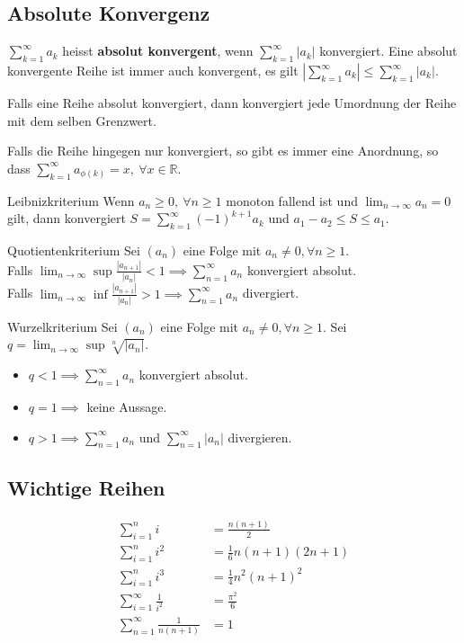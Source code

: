 \documentclass[a4paper,10pt]{article}
\def\limn{\lim_{n\to \infty}}
\def\sumk{\sum_{k=1}^\infty}
\def\R{\mathbb{R}}
\begin{document}
\subsection{Absolute Konvergenz}
$\sumk a_k$ heisst \textbf{absolut konvergent}, wenn $\sumk |a_k|$ konvergiert. Eine absolut konvergente Reihe ist immer auch konvergent, es gilt $|\sumk a_k| \le \sumk |a_k|$.

Falls eine Reihe absolut konvergiert, dann konvergiert jede Umordnung der Reihe mit dem selben Grenzwert.

Falls die Reihe hingegen nur konvergiert, so gibt es immer eine Anordnung, so dass $\sum_{k=1}^\infty a_{\phi(k)} = x, \ \forall x\in \R$.

\begin{subbox}{Leibnizkriterium}
Wenn $a_n \ge 0, \ \forall n \ge 1$ monoton fallend ist und $\limn a_n = 0$ gilt, dann konvergiert $S = \sumk (-1)^{k+1} a_k$ und $a_1 - a_2 \le S \le a_1$.
\end{subbox}

\begin{mainbox}{Quotientenkriterium}
Sei $(a_n)$ eine Folge mit $a_n \ne 0, \forall n \ge 1$. \\ Falls $\limn \sup \frac{|a_{n+1}|}{|a_n|} < 1 \implies \sum_{n=1}^\infty a_n$ konvergiert absolut. \\Falls $\limn \inf \frac{|a_{n+1}|}{|a_n|} > 1 \implies \sum_{n=1}^\infty a_n$ divergiert.  
\end{mainbox}

\begin{mainbox}{Wurzelkriterium}
Sei $(a_n)$ eine Folge mit $a_n \ne 0, \forall n \ge 1$. Sei $q = \limn \sup \sqrt[n]{|a_n|}$. 
\begin{itemize}
 \item $q < 1 \implies \sum_{n=1}^\infty a_n$ konvergiert absolut.
 \item $q = 1 \implies$ keine Aussage.
 \item $q > 1 \implies \sum_{n=1}^\infty a_n$ und $\sum_{n=1}^\infty |a_n|$ divergieren.
\end{itemize}
\end{mainbox}

\subsection{Wichtige Reihen}
\begin{align*}
 \sum_{i=1}^n i &= \frac{n(n+1)}{2} \\
 \sum_{i=1}^n i^2 &= \frac{1}{6}n(n+1)(2n+1) \\
 \sum_{i=1}^n i^3 &= \frac{1}{4}n^2(n+1)^2 \\
 \sum_{i=1}^\infty \frac{1}{i^2} &= \frac{\pi^2}{6} \\
 \sum_{n=1}^\infty \frac{1}{n(n+1)} &= 1
\end{align*}
\end{document}
